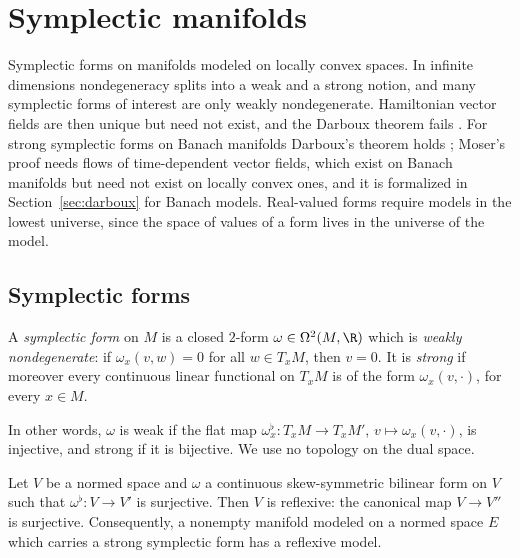 \chapter{Symplectic manifolds}
\label{chap:symplectic}

Symplectic forms on manifolds modeled on locally convex spaces. In infinite dimensions
nondegeneracy splits into a weak and a strong notion, and many symplectic forms of interest are
only weakly nondegenerate. Hamiltonian vector fields are then unique but need not exist, and the
Darboux theorem fails \cite[Proposition, p.~591]{Mar72}. For strong symplectic forms on Banach
manifolds Darboux's theorem holds \cite[\S1, Theorem]{Wei69}; Moser's proof needs flows of
time-dependent vector fields, which exist on Banach manifolds but need not exist on locally convex
ones, and it is formalized in Section~\ref{sec:darboux} for Banach models. Real-valued forms
require models in the lowest universe, since the space of values of a form lives in the universe
of the model.

\section{Symplectic forms}

\begin{definition}
  \label{def:symplectic}
  \leanok
  A \emph{symplectic form} on $M$ is a closed $2$-form $\omega \in \Omega^2(M, \R)$ which is
  \emph{weakly nondegenerate}: if $\omega_x(v, w) = 0$ for all $w \in T_xM$, then $v = 0$. It is
  \emph{strong} if moreover every continuous linear functional on $T_xM$ is of the form
  $\omega_x(v, \cdot)$, for every $x \in M$.
\end{definition}

In other words, $\omega$ is weak if the flat map $\omega^\flat_x \colon T_xM \to T_xM'$,
$v \mapsto \omega_x(v, \cdot)$, is injective, and strong if it is bijective. We use no topology
on the dual space.

\begin{theorem}
  \label{thm:symplectic-reflexive}
  \leanok
  Let $V$ be a normed space and $\omega$ a continuous skew-symmetric bilinear form on $V$ such
  that $\omega^\flat \colon V \to V'$ is surjective. Then $V$ is reflexive: the canonical map
  $V \to V''$ is surjective. Consequently, a nonempty manifold modeled on a normed space $E$ which
  carries a strong symplectic form has a reflexive model.
\end{theorem}

